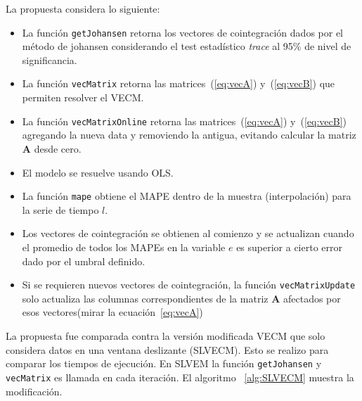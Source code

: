 La propuesta considera lo siguiente:
\begin{itemize}
 \item La función \texttt{getJohansen} retorna los vectores de cointegración
dados por el método de johansen considerando el test estadístico \emph{trace}
al 95\% de nivel de significancia.
 \item La función \texttt{vecMatrix} retorna las matrices~(\ref{eq:vecA})
y~(\ref{eq:vecB}) que permiten resolver el VECM.
 \item La función \texttt{vecMatrixOnline} retorna las matrices~(\ref{eq:vecA})
y~(\ref{eq:vecB}) agregando la nueva data y removiendo la antigua, evitando
calcular la matriz $\mathbf{A}$ desde cero.
 \item El modelo se resuelve usando OLS.
 \item La función \texttt{mape} obtiene el MAPE dentro de la muestra
(interpolación) para la serie de tiempo $l$.
 \item Los vectores de cointegración se obtienen al comienzo y se actualizan
cuando el promedio de todos los MAPEs en la variable $e$ es superior a cierto
error dado por el umbral definido.
 \item Si se requieren nuevos vectores de cointegración, la función
\texttt{vecMatrixUpdate} solo actualiza las columnas correspondientes de la
matriz $\mathbf{A}$ afectados por esos vectores(mirar la
ecuación~\ref{eq:vecA})
\end{itemize}

La propuesta fue comparada contra la versión modificada VECM que solo considera
datos en una ventana deslizante (SLVECM). Esto se realizo para comparar los
tiempos de ejecución. En SLVEM la función \texttt{getJohansen} y
\texttt{vecMatrix} es llamada en cada iteración. El algoritmo ~\ref{alg:SLVECM}
muestra la modificación.

